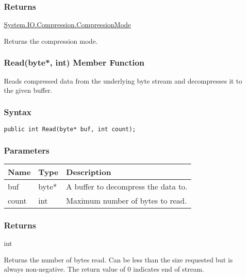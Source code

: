 \documentclass[a4paper,oneside,11.000000pt]{book}
\begin{document}
\subsubsection*{Returns}
\hyperlink{System.IO.Compression.CompressionMode}{System.\-IO.\-Compression.\-CompressionMode}\begin{flushleft}
Returns the compression mode.

\end{flushleft}
\clearpage

\hypertarget{System.IO.Compression.BZip2Stream.Read.P.System.IO.Compression.BZip2Stream.P.byte.int}{\subsubsection*{Read(byte*, int) Member Function}}
\begin{flushleft}
Reads compressed data from the underlying byte stream and decompresses it to the given buffer.

\end{flushleft}
\subsubsection*{Syntax}\texttt{public int Read(byte* buf, int count);}

\subsubsection*{Parameters}
\begin{flushleft}
\begin{supertabular}[l]{lll}
\textbf{Name}
& \textbf{Type}
& \textbf{Description}
\\
\hline
buf
& byte*
& A buffer to decompress the data to.

\\
count
& int
& Maximum number of bytes to read.

\\
\end{supertabular}

\end{flushleft}
\subsubsection*{Returns}int
\begin{flushleft}
Returns the number of bytes read. Can be less than the size requested but is always non-negative.
The return value of 0 indicates end of stream.

\end{flushleft}
\end{document}
